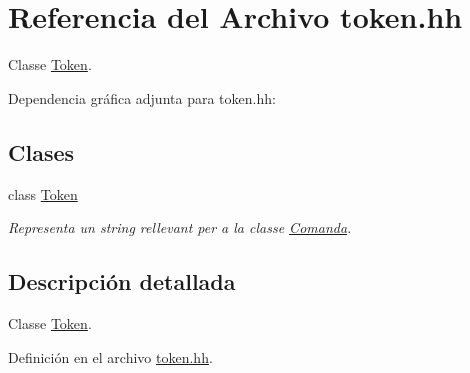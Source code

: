 \hypertarget{token_8hh}{\section{Referencia del Archivo token.\-hh}
\label{token_8hh}
}


Classe \hyperlink{class_token}{Token}.  


Dependencia gráfica adjunta para token.\-hh\-:
\subsection*{Clases}
\begin{DoxyCompactItemize}
\item 
class \hyperlink{class_token}{Token}
\begin{DoxyCompactList}\small\item\em Representa un string rellevant per a la classe \hyperlink{class_comanda}{Comanda}. \end{DoxyCompactList}\end{DoxyCompactItemize}


\subsection{Descripción detallada}
Classe \hyperlink{class_token}{Token}. 

Definición en el archivo \hyperlink{token_8hh_source}{token.\-hh}.

